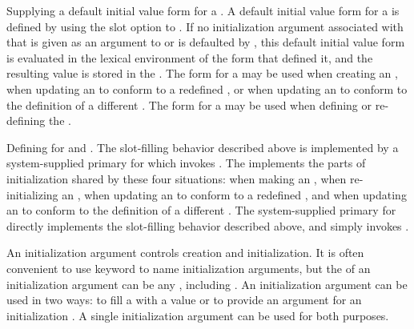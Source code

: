 \itemitem{\bull} Supplying a default initial value form for a .  
A default initial value form for a  is defined by using the 
 slot option to .  If no initialization
argument associated with that  is given as an argument to 
 or is defaulted by , this
default initial value form is evaluated in the lexical environment of
the  form that defined it, and the resulting value is
stored in the .  The  form for a
 may be used when creating an , when 
updating an  to conform to a redefined , 
or when updating an  to conform to the definition of a
different . The  form for a
 may be used when defining or re-defining the .
                                                                       
\itemitem{\bull} 
Defining  for  and
.  The slot-filling behavior described above is
implemented by a system-supplied primary  for
 which invokes . The
  implements the parts of
initialization shared by these four situations: when making an , 
when re-initializing an , when updating an 
to conform to a redefined , and when updating an  
to conform to the definition of a different . The system-supplied
primary  for  directly implements the
slot-filling behavior described above, and 
simply invokes .

\endlist


An initialization argument controls  creation and
initialization.  It is often convenient to use keyword 
to name initialization arguments, but the  of an
initialization argument can be any , including \nil.  An
initialization argument can be used in two ways: to fill a 
with a value or to provide an argument for an initialization
.  A single initialization argument can be used for both
purposes.

